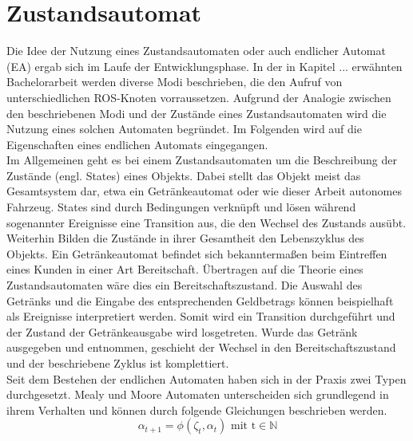 		
	

			
	\section{Zustandsautomat}
	\label{sec: Zustandautomat}
	Die Idee der Nutzung eines Zustandsautomaten oder auch endlicher Automat (EA) ergab sich im Laufe der Entwicklungsphase. In der in Kapitel ... erwähnten Bachelorarbeit werden diverse Modi beschrieben, die den Aufruf von unterschiedlichen ROS-Knoten vorraussetzen. Aufgrund der Analogie zwischen den beschriebenen Modi und der Zustände eines Zustandsautomaten wird die Nutzung eines solchen Automaten begründet. Im Folgenden wird auf die Eigenschaften eines endlichen Automats eingegangen.\\
	
	Im Allgemeinen geht es bei einem Zustandsautomaten um die Beschreibung der Zustände (engl. States) eines Objekts. Dabei stellt das Objekt meist das Gesamtsystem dar, etwa ein Getränkeautomat oder wie dieser Arbeit autonomes Fahrzeug. States sind durch Bedingungen verknüpft und lösen während sogenannter Ereignisse eine Transition aus, die den Wechsel des Zustands ausübt. Weiterhin Bilden die Zustände in ihrer Gesamtheit den Lebenszyklus des Objekts. Ein Getränkeautomat befindet sich bekanntermaßen beim Eintreffen eines Kunden in einer Art Bereitschaft. Übertragen auf die Theorie eines Zustandsautomaten wäre dies ein Bereitschaftszustand. Die Auswahl des Getränks und die Eingabe des entsprechenden Geldbetrags können beispielhaft als Ereignisse interpretiert werden. Somit wird ein Transition durchgeführt und der Zustand der Getränkeausgabe wird losgetreten. Wurde das Getränk ausgegeben und entnommen, geschieht der Wechsel in den Bereitschaftszustand und der beschriebene Zyklus ist komplettiert.\\
	
	Seit dem Bestehen der endlichen Automaten haben sich in der Praxis zwei Typen durchgesetzt. Mealy und Moore Automaten unterscheiden sich grundlegend in ihrem Verhalten und können durch folgende Gleichungen beschrieben werden.\\
	
	\begin{equation}
		\alpha_{t+1}=\phi(\zeta_t,\alpha_t)\text{    mit    t}\in\mathbb{N}
		\label{eq: transferfct}
	\end{equation}

